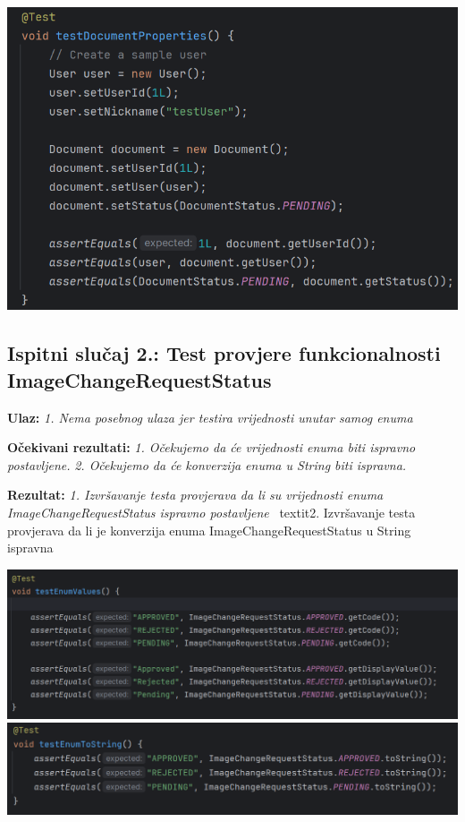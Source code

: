             \includegraphics[width=1\linewidth]{slike/DokumentTest.png}


            \subsection{Ispitni slučaj 2.: Test provjere funkcionalnosti ImageChangeRequestStatus}

                                    \textbf{Ulaz:}
                                    \textit{1. Nema posebnog ulaza jer testira vrijednosti unutar samog enuma}

                                    \textbf{Očekivani rezultati:}
                                    \textit{1. Očekujemo da će vrijednosti enuma biti ispravno postavljene.}
                                    \textit{2. Očekujemo da će konverzija enuma u String biti ispravna.}

                                    \textbf{Rezultat:}
                                    \textit{1. Izvršavanje testa provjerava da li su vrijednosti enuma ImageChangeRequestStatus ispravno postavljene}
                                    ~textit{2. Izvršavanje testa provjerava da li je konverzija enuma ImageChangeRequestStatus u String ispravna}

            \includegraphics[width=1\linewidth]{slike/ImageChangeTest.png}
            \includegraphics[width=1\linewidth]{slike/ImageChangeTest1.png}

